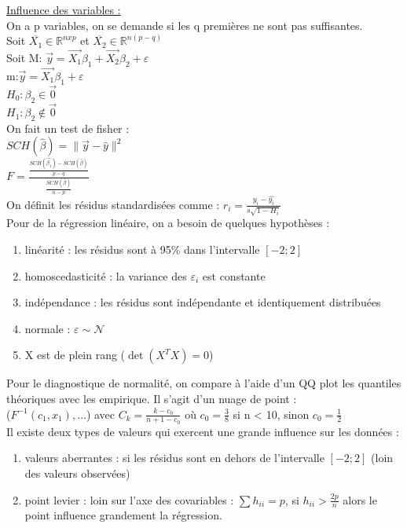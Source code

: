 \documentclass[../main.tex]{subfiles}
\begin{document}
\quad \underline{Influence des variables :}\\
On a p variables, on se demande si les q premières ne sont pas suffisantes.\\
Soit $\overline{X_1} \in \mathbb{R}^{nxp}$ et $\overline{X_2} \in \mathbb{R}^{n(p-q)}$\\
Soit M: $\vec{y} = \vec{X_1}\beta_1 + \vec{X_2} \beta_2 + \varepsilon$\\
m:$\vec{y} = \vec{X_1} \beta_1 + \varepsilon$\\
$H_0 : \beta_2 \in \vec{0}$\\
$H_1 : \beta_2 \notin \vec{0}$\\
On fait un test de fisher : \\
$SCH(\hat{\beta}) = \parallel \vec{y} - \hat{y}\parallel^2 $\\
$F = \frac{\frac{SCH(\hat{\beta_1})-SCH(\hat{\beta})}{p-q}}{\frac{SCH(\hat{\beta})}{n-p}}$\\

On définit les résidus standardisées comme : $r_i = \frac{y_i-\hat{y_i}}{s\sqrt{1-H_i}}$\\
Pour de la régression linéaire, on a besoin de quelques hypothèses :\\
\begin{enumerate}
    \item linéarité : les résidus sont à 95$\%$ dans l'intervalle $[-2;2]$\\
    \item homoscedasticité : la variance des $\varepsilon_i$ est constante\\
    \item indépendance : les résidus sont indépendante et identiquement distribuées\\
    \item normale : $\varepsilon \sim \mathcal{N}$\\
    \item X est de plein rang ($\det(X^TX) = 0$)\\
\end{enumerate}

Pour le diagnostique de normalité, on compare à l'aide d'un QQ plot les quantiles théoriques avec les empirique. Il s'agit d'un nuage de point :\\
($F^{-1}(c_1, x_1), \dots$) avec $C_k = \frac{k-c_0}{n+1-c_0}$ où $c_0 = \frac{3}{8}$ si n < 10, sinon $c_0 = \frac{1}{2}$\\

Il existe deux types de valeurs qui exercent une grande influence sur les données : \\
\begin{enumerate}
    \item valeurs aberrantes : si les résidus sont en dehors de l'intervalle $[-2; 2]$ (loin des valeurs observées)\\
    \item point levier : loin sur l'axe des covariables : $\sum h_{ii} = p$, si $h_{ii} > \frac{2p}{n}$ alors le point influence grandement la régression.\\
\end{enumerate}
\end{document}

